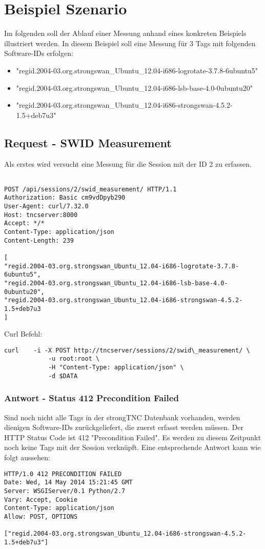 \documentclass[10pt,a4paper]{scrartcl}
\begin{document}
\section{Beispiel Szenario}
Im folgenden soll der Ablauf einer Messung anhand eines konkreten Beispiels illustriert werden. In diesem Beispiel soll eine Messung für 3 Tags mit folgenden Software-IDs erfolgen:
\begin{itemize}
\item "regid.2004-03.org.strongswan\_Ubuntu\_12.04-i686-logrotate-3.7.8-6ubuntu5"
\item "regid.2004-03.org.strongswan\_Ubuntu\_12.04-i686-lsb-base-4.0-0ubuntu20"
\item "regid.2004-03.org.strongswan\_Ubuntu\_12.04-i686-strongswan-4.5.2-1.5+deb7u3"
\end{itemize}

\subsection{Request - SWID Measurement}
Als erstes wird versucht eine Messung für die Session mit der ID 2 zu erfassen. \hfill
\begin{lstlisting}

POST /api/sessions/2/swid_measurement/ HTTP/1.1
Authorization: Basic cm9vdDpyb290
User-Agent: curl/7.32.0
Host: tncserver:8000
Accept: */*
Content-Type: application/json
Content-Length: 239

[
"regid.2004-03.org.strongswan_Ubuntu_12.04-i686-logrotate-3.7.8-6ubuntu5",
"regid.2004-03.org.strongswan_Ubuntu_12.04-i686-lsb-base-4.0-0ubuntu20",
"regid.2004-03.org.strongswan_Ubuntu_12.04-i686-strongswan-4.5.2-1.5+deb7u3
]

\end{lstlisting}

Curl Befehl:
\begin{lstlisting}
curl	-i -X POST http://tncserver/sessions/2/swid\_measurement/ \
			-u root:root \
			-H "Content-Type: application/json" \
			-d $DATA
\end{lstlisting}
\subsubsection{Antwort - Status 412 Precondition Failed}
Sind noch nicht alle Tags in der strongTNC Datenbank vorhanden, werden dienigen Software-IDs zurückgeliefert, die zuerst erfasst werden müssen. Der HTTP Status Code ist 412 "Precondition Failed". Es werden zu diesem Zeitpunkt noch keine Tags mit der Session verknüpft. Eine entsprechende Antwort kann wie folgt aussehen:
\begin{lstlisting}
HTTP/1.0 412 PRECONDITION FAILED
Date: Wed, 14 May 2014 15:21:45 GMT
Server: WSGIServer/0.1 Python/2.7
Vary: Accept, Cookie
Content-Type: application/json
Allow: POST, OPTIONS

["regid.2004-03.org.strongswan_Ubuntu_12.04-i686-strongswan-4.5.2-1.5+deb7u3"]
\end{lstlisting}
\end{document}
